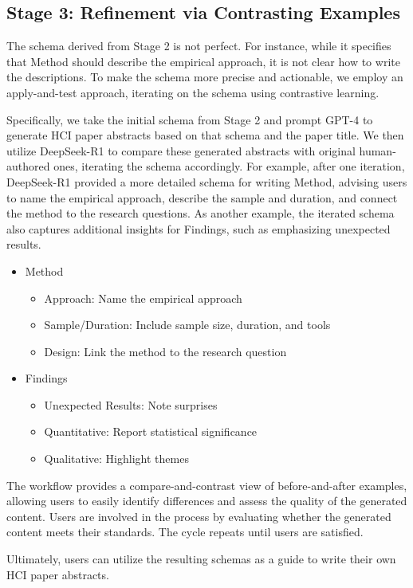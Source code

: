 \subsection{Stage 3: Refinement via Contrasting Examples}
The schema derived from Stage 2 is not perfect. 
For instance, while it specifies that Method should describe the empirical approach, it is not clear how to write the descriptions. 
To make the schema more precise and actionable, we employ an apply-and-test approach, iterating on the schema using contrastive learning.

Specifically, we take the initial schema from Stage 2 and prompt GPT-4 to generate HCI paper abstracts based on that schema and the paper title.
We then utilize DeepSeek-R1 to compare these generated abstracts with original human-authored ones, iterating the schema accordingly. 
For example, after one iteration, DeepSeek-R1 provided a more detailed schema for writing Method, advising users to name the empirical approach, describe the sample and duration, and connect the method to the research questions. 
As another example, the iterated schema also captures additional insights for Findings, such as emphasizing unexpected results.


\begin{itemize}[noitemsep]
    \item Method
            \begin{itemize}[noitemsep]
                \item Approach: Name the empirical approach 
                \item Sample/Duration: Include sample size, duration, and tools 
                \item Design: Link the method to the research question 
            \end{itemize}
    \item Findings
            \begin{itemize}[noitemsep]
                \item Unexpected Results: Note surprises
                \item Quantitative: Report statistical significance
                \item Qualitative: Highlight themes
            \end{itemize}
\end{itemize}

The workflow provides a compare-and-contrast view of before-and-after examples, allowing users to easily identify differences and assess the quality of the generated content. 
Users are involved in the process by evaluating whether the generated content meets their standards. 
The cycle repeats until users are satisfied.


Ultimately, users can utilize the resulting schemas as a guide to write their own HCI paper abstracts.